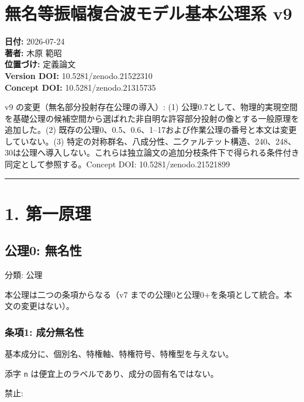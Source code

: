\documentclass[
  a4paper,
]{ltjsarticle}
\author{}
\date{}
\begin{document}
\section{無名等振幅複合波モデル基本公理系
v9}\label{ux7121ux540dux7b49ux632fux5e45ux8907ux5408ux6ce2ux30e2ux30c7ux30ebux57faux672cux516cux7406ux7cfb-v9}

\textbf{日付:} 2026-07-24\\
\textbf{著者:} 木原 範昭\\
\textbf{位置づけ:} 定義論文\\
\textbf{Version DOI:} 10.5281/zenodo.21522310\\
\textbf{Concept DOI:} 10.5281/zenodo.21315735

v9 の変更（無名部分投射存在公理の導入）: (1)
公理0.7として、物理的実現空間を基礎公理の候補空間から選ばれた非自明な許容部分投射の像とする一般原理を追加した。(2)
既存の公理0、0.5、0.6、1--17および作業公理の番号と本文は変更していない。(3)
特定の対称群名、八成分性、二クァルテット構造、240、248、30は公理へ導入しない。これらは独立論文の追加分枝条件下で得られる条件付き同定として参照する。Concept
DOI: 10.5281/zenodo.21521899

\begin{center}\rule{0.5\linewidth}{0.5pt}\end{center}

\section{1. 第一原理}\label{ux7b2cux4e00ux539fux7406}

\subsection{公理0: 無名性}\label{ux516cux74060-ux7121ux540dux6027}

分類: 公理

本公理は二つの条項からなる（v7
までの公理0と公理0+を条項として統合。本文の変更はない）。

\subsubsection{条項1:
成分無名性}\label{ux6761ux98051-ux6210ux5206ux7121ux540dux6027}

基本成分に、個別名、特権軸、特権符号、特権型を与えない。

添字 \texttt{n} は便宜上のラベルであり、成分の固有名ではない。

禁止:
\end{document}
